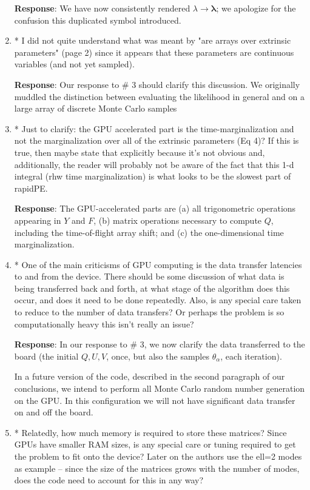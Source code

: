 \documentclass[onecolumn]{revtex4}
\begin{document}
\begin{enumerate}
\noindent \textbf{Response}: We have now consistently rendered $\lambda\rightarrow \bm{\lambda}$; we apologize for the
confusion this duplicated symbol introduced.

\item * I did not quite understand what was meant by "are arrays over
extrinsic parameters" (page 2) since it appears that these parameters
are continuous variables (and not yet sampled).

\noindent \textbf{Response}: Our response to \# 3 should clarify this discussion.  We originally muddled the distinction
between evaluating the likelihood in general and on a large array of discrete  Monte Carlo samples

\item * Just to clarify: the GPU accelerated part is the
time-marginalization and not the marginalization over all of the
extrinsic parameters (Eq 4)? If this is true, then maybe state that
explicitly because it's not obvious and, additionally, the reader will
probably not be aware of the fact that this 1-d integral (rhw time
marginalization) is what looks to be the slowest part of rapidPE.

\noindent \textbf{Response}: The GPU-accelerated parts are (a) all trigonometric operations appearing in $Y$ and $F$, (b)  matrix operations
necessary to compute $Q$, including the time-of-flight array shift; and (c) the one-dimensional time marginalization.

\item * One of the main criticisms of GPU computing is the data transfer
latencies to and from the device. There should be some discussion of
what data is being transferred back and forth, at what stage of the
algorithm does this occur, and does it need to be done repeatedly.
Also, is any special care taken to reduce to the number of data
transfers? Or perhaps the problem is so computationally heavy this
isn't really an issue?

\noindent \textbf{Response}: In our response to \# 3, we now clarify the data transferred to the board (the initial
$Q,U,V$, once,  but also the samples $\theta_\alpha$, each iteration).  

In a future version of the code, described in the second paragraph of our conclusions, we intend to perform all Monte
Carlo random number generation on the GPU.  In this configuration we will not have significant data transfer on and off
the board.

\item * Relatedly, how much memory is required to store these matrices?
Since GPUs have smaller RAM sizes, is any special care or tuning
required to get the problem to fit onto the device? Later on the
authors use the ell=2 modes as example -- since the size of the
matrices grows with the number of modes, does the code need to account
for this in any way?


\end{enumerate}
\end{document}
